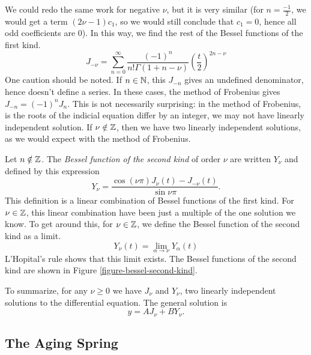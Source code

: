 \documentclass[fleqn,letterpaper]{report}
\begin{document}
We could redo the same work for negative $\nu$, but it is
very similar (for $n = \frac{-1}{2}$, we would get a term
$(2\nu - 1) c_1$, so we would still conclude that $c_1 = 0$,
hence all odd coefficients are $0$). In this way, we find the
rest of the Bessel functions of the first kind.
\begin{equation*}
J_{-\nu} = \sum_{n=0}^\infty \frac{(-1)^n}{n! \Gamma(1+n-\nu)}
\left( \frac{t}{2} \right)^{2n-\nu} 
\end{equation*}
One caution should be noted. If $n \in \mathbb{N}$, this $J_{-n}$
gives an undefined denominator, hence doesn't define a series. 
In these cases, the method of Frobenius gives $J_{-n} =
(-1)^n J_{n}$. This is not necessarily surprising: in the
method of Frobenius, is the roots of the indicial equation
differ by an integer, we may not have linearly independent
solution. If $\nu \notin \mathbb{Z}$, then we have
two linearly independent solutions, as we would
expect with the method of Frobenius.

\begin{defn}
Let $n \notin \mathbb{Z}$. The \emph{Bessel function of the second
kind} of order $\nu$ are written $Y_{\nu}$ and defined by this
expression
\begin{equation*}
Y_{\nu} = \frac{\cos (\nu \pi) J_{\nu}(t) - J_{-\nu}(t)}{\sin \nu
\pi}.
\end{equation*}
This definition is a linear combination of Bessel functions of
the first kind. For $\nu \in \mathbb{Z}$, this linear combination
have been just a multiple of the one solution we know. To get
around this, for $\nu \in \mathbb{Z}$, we define the Bessel function
of the second kind as a limit.  
\begin{equation*}
Y_{\nu}(t) = \lim_{\alpha \rightarrow \nu} Y_{\alpha}(t)
\end{equation*}
L'Hopital's rule shows that this limit exists.  The Bessel
functions of the second kind are shown in Figure
\ref{figure-bessel-second-kind}. 
\end{defn}

To summarize, for any $\nu \geq 0$ we have $J_{\nu}$ and
$Y_{\nu}$, two linearly independent solutions to the
differential equation. The general solution is
\begin{equation*}
y = A J_{\nu} + B Y_{\nu}.
\end{equation*}

\subsection{The Aging Spring}
\label{aging-spring}
\end{document}
